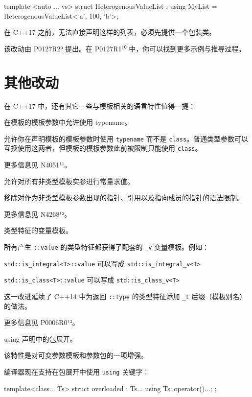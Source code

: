 \begin{codebox}[cpp]
template <auto ... vs> struct HeterogenousValueList {};
using MyList = HeterogenousValueList<'a', 100, 'b'>;
\end{codebox}

在 C++17 之前，无法直接声明这样的列表，必须先提供一个包装类。

\begin{myInfoBox}
该改动由 P0127R2⁹ 提出。在 P0127R1¹⁰ 中，你可以找到更多示例与推导过程。
\end{myInfoBox}

\section{其他改动}

在 C++17 中，还有其它一些与模板相关的语言特性值得一提：

在模板的模板参数中允许使用 typename。

允许你在声明模板的模板参数时使用 \texttt{typename} 而不是 \texttt{class}。普通类型参数可以互换使用这两者，但模板的模板参数此前被限制只能使用 \texttt{class}。

更多信息见 N4051¹¹。

允许对所有非类型模板实参进行常量求值。

移除对作为非类型模板参数出现的指针、引用以及指向成员的指针的语法限制。

更多信息见 N4268¹²。

类型特征的变量模板。

所有产生 \texttt{::value} 的类型特征都获得了配套的 \texttt{\_v} 变量模板。例如：

\texttt{std::is\_integral<T>::value} 可以写成 \texttt{std::is\_integral\_v<T>}

\texttt{std::is\_class<T>::value} 可以写成 \texttt{std::is\_class\_v<T>}

这一改进延续了 C++14 中为返回 \texttt{::type} 的类型特征添加 \texttt{\_t} 后缀（模板别名）的做法。

更多信息见 P0006R0¹³。

using 声明中的包展开。

该特性是对可变参数模板和参数包的一项增强。

编译器现在支持在包展开中使用 \texttt{using} 关键字：

\begin{codebox}[cpp]
template<class... Ts> struct overloaded : Ts... {
using Ts::operator()...;
};
\end{codebox}

